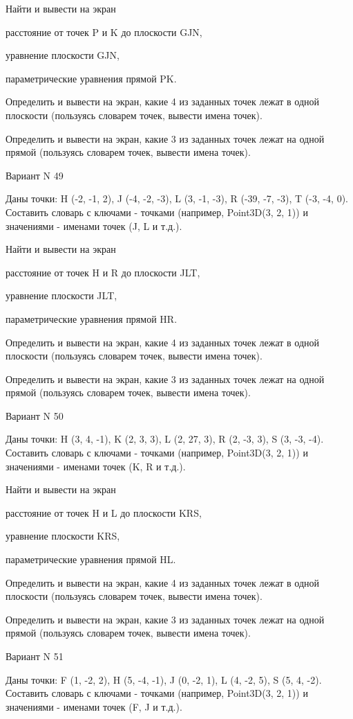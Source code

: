 \documentclass[11pt]{report}
\begin{document}
Найти и вывести на экран


расстояние от точек P и K до плоскости GJN,


уравнение плоскости GJN,


параметрические уравнения прямой PK.


Определить и вывести на экран, какие 4 из заданных точек лежат в одной плоскости (пользуясь словарем точек, вывести имена точек).


Определить и вывести на экран, какие 3 из заданных точек лежат на одной прямой (пользуясь словарем точек, вывести имена точек).

\newpage
Вариант N 49

Даны точки: H (-2, -1, 2), J (-4, -2, -3), L (3, -1, -3), R (-39, -7, -3), T (-3, -4, 0).
Составить словарь с ключами - точками (например, Point3D(3, 2, 1)) и значениями - именами точек (J, L и т.д.).


Найти и вывести на экран


расстояние от точек H и R до плоскости JLT,


уравнение плоскости JLT,


параметрические уравнения прямой HR.


Определить и вывести на экран, какие 4 из заданных точек лежат в одной плоскости (пользуясь словарем точек, вывести имена точек).


Определить и вывести на экран, какие 3 из заданных точек лежат на одной прямой (пользуясь словарем точек, вывести имена точек).

\newpage
Вариант N 50

Даны точки: H (3, 4, -1), K (2, 3, 3), L (2, 27, 3), R (2, -3, 3), S (3, -3, -4).
Составить словарь с ключами - точками (например, Point3D(3, 2, 1)) и значениями - именами точек (K, R и т.д.).


Найти и вывести на экран


расстояние от точек H и L до плоскости KRS,


уравнение плоскости KRS,


параметрические уравнения прямой HL.


Определить и вывести на экран, какие 4 из заданных точек лежат в одной плоскости (пользуясь словарем точек, вывести имена точек).


Определить и вывести на экран, какие 3 из заданных точек лежат на одной прямой (пользуясь словарем точек, вывести имена точек).

\newpage
Вариант N 51

Даны точки: F (1, -2, 2), H (5, -4, -1), J (0, -2, 1), L (4, -2, 5), S (5, 4, -2).
Составить словарь с ключами - точками (например, Point3D(3, 2, 1)) и значениями - именами точек (F, J и т.д.).
\end{document}
